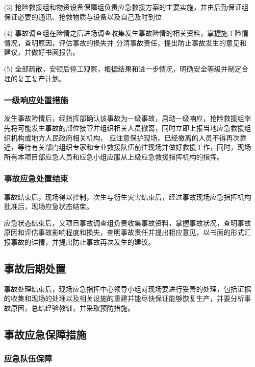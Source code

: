 (3) 抢险救援组和物资设备保障组负责应急救援方案的主要实施，并由后勤保证组保证必要的通讯、抢救物质与设备以及自己及时到位

(4) 事故调查组在险情之后进场调查收集发生事故险情的相关资料，掌握施工险情情况，查明原因，评估事故的损失并
分清事故责任，提出防止事故发生的意见和建议，并做好书面报告。

(5) 全部疏散，安顿后停工观察，根据结果和进一步情况，明确安全等级并制定合理的复工复产计划。

\subsubsection{一级响应处置措施}

发生事故险情后，经指挥部确认该事故为一级事故，启动一级响应，抢险救援组率先将可能发生事故的部位接管并组织相关人员撤离，同时立即上报当地应急救援组织机构或地方人民政府相关机构，
应注意保护现场，已经撤离的人员不得再次靠近，等待有关部门组织专家和专业救援队伍前往现场并做好救援工作，同时，现场所有本项目部应急人员和应急小组应服从上级应急救援指挥机构的指挥。

\subsubsection{事故应急处置结束}

事故结束后，现场得以控制，次生与衍生灾害结束后，经过事故现场应急指挥机构批准后，现场应急状态结束。

应急状态结束后，又项目事故调查组负责收集事故资料，掌握事故状况，查明事故原因和评估事故影响程度和损失，查明事故责任并提出相应意见，以书面的形式汇报事故的详情，并提出防止事故再次发生的建议。

\subsection{事故后期处置}

事故处理结束后，现场应急指挥中心领导小组对现场要进行妥善的处理，包括证据的收集和现场的处理以及相关设施的重建并能尽快保证能够恢复生产，并要分析事故原因，总结经验教训，并采取预防措施。

\subsection{事故应急保障措施}
\subsubsection{应急队伍保障}

